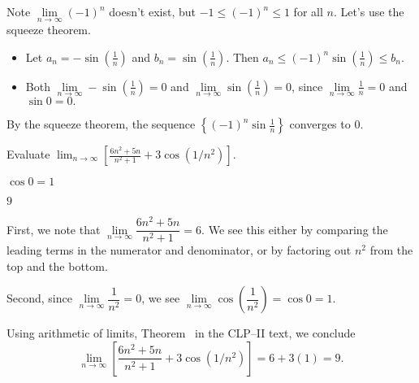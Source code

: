 \begin{solution}
Note $\lim\limits_{n\to \infty} (-1)^n$ doesn't exist, but $-1 \leq (-1)^n\leq 1$ for all $n$. Let's use the squeeze theorem.
\begin{itemize}
\item Let $a_n=-\sin\left(\frac{1}{n}\right)$ and $b_n=\sin\left(\frac{1}{n}\right)$. Then
$a_n\leq (-1)^n\sin\left(\frac{1}{n}\right) \leq b_n$.
\item Both $\lim\limits_{n \to \infty} -\sin\left(\frac{1}{n}\right)=0$ and $\lim\limits_{n \to \infty} \sin\left(\frac{1}{n}\right)=0$, since $\lim\limits_{n \to \infty} \frac{1}{n}=0$ and $\sin 0=0.$
\end{itemize}
By the squeeze theorem,
the sequence $\left\{(-1)^n\sin\frac{1}{n}\right\}$ converges to $0$.
\end{solution}

\begin{Mquestion}[2016Q5]
Evaluate
$
\displaystyle\lim_{n\rightarrow\infty}\left[\frac{6n^2+5n}{n^2+1} +3\cos(1/n^2) \right]
$.
\end{Mquestion}

\begin{hint}
$\cos 0 =1$
\end{hint}

\begin{answer}
$9$
\end{answer}

\begin{solution}
First, we note that $\lim\limits_{n \to \infty}\dfrac{6n^2+5n}{n^2+1}=6$. We see this either by comparing the leading terms in the numerator and denominator, or by factoring out $n^2$ from the top and the bottom.

Second, since $\lim\limits_{n \to \infty}\dfrac{1}{n^2}=0$, we see
$\lim\limits_{n \to \infty}\cos\left(\dfrac{1}{n^2}\right)=\cos0=1$.

Using
arithmetic of limits,
Theorem~ in the CLP--II text, we conclude
\[
\displaystyle\lim_{n\rightarrow\infty}\left[\frac{6n^2+5n}{n^2+1} +3\cos(1/n^2) \right]
=6+3(1)=9.
\]

\end{solution}






\subsection*{\Application}


